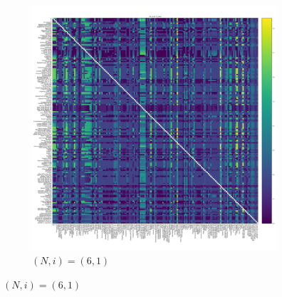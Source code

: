 \documentclass{article}
\begin{document}
\begin{figure}[!hbtp]
    ~
    \begin{subfigure}[t]{.3\textwidth}
        \centering
        \includegraphics[width=.8\textwidth]{../img/fixation_heatmap_6_1_std.pdf}
        \caption{\((N,i)=(6, 1)\)}
    \end{subfigure}%


\end{figure}
\end{document}
